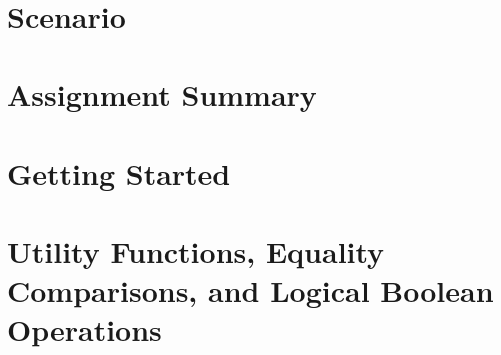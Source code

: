 




\renewcommand{\labnumber}{\integerlabnumber}
\renewcommand{\labname}{Integer Representation and Arithmetic Lab}
\renewcommand{\shortlabname}{integerlab}
\renewcommand{\collaborationrules}{\integerlabcollaboration}
\renewcommand{\duedate}{\integerlabdue}

\pagelayout

\labidentifier\


\softwareengineeringfrontmatter

\section*{Scenario}                                                                                     \OnLoanToEclecticElectronics

\section{Assignment Summary}                                                                            

\section{Getting Started}                                                                               

\section{Utility Functions, Equality Comparisons, and Logical Boolean Operations}\label{sec:utility}    

